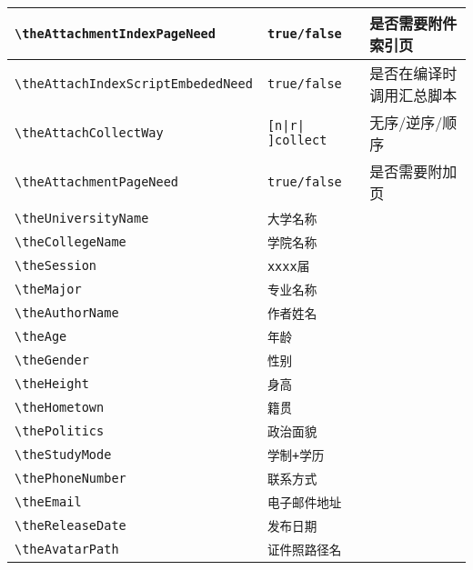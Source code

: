 \documentclass[a4paper,12pt]{ctexart}
\begin{document}
\begin{table}[!h]
\begin{tabularx}{\textwidth}{|l|l|>{\raggedright\arraybackslash}X|}
			\hline
			\texttt{\textbackslash theAttachmentIndexPageNeed} & \texttt{true/false}                            & 是否需要附件索引页               \\
			\hline
			\texttt{\textbackslash theAttachIndexScriptEmbededNeed} & \texttt{true/false}                      & 是否在编译时调用汇总脚本         \\
			\hline
			\texttt{\textbackslash theAttachCollectWay}    & \texttt{[n|r| ]collect}               & 无序/逆序/顺序                 \\
			\hline
			\texttt{\textbackslash theAttachmentPageNeed}  & \texttt{true/false}                               & 是否需要附加页                   \\
			\hline
			\texttt{\textbackslash theUniversityName}      & \texttt{大学名称}&\\
			\hline
			\texttt{\textbackslash theCollegeName}         & \texttt{学院名称}&\\
			\hline
			\texttt{\textbackslash theSession}             & \texttt{xxxx届}&\\
			\hline
			\texttt{\textbackslash theMajor}               & \texttt{专业名称}&\\
			\hline
			\texttt{\textbackslash theAuthorName}          & \texttt{作者姓名}&\\
			\hline
			\texttt{\textbackslash theAge}                 & \texttt{年龄}&\\
			\hline
			\texttt{\textbackslash theGender}              & \texttt{性别}&\\
			\hline
			\texttt{\textbackslash theHeight}              & \texttt{身高}&\\
			\hline
			\texttt{\textbackslash theHometown}            & \texttt{籍贯}&\\
			\hline
			\texttt{\textbackslash thePolitics}            & \texttt{政治面貌}&\\
			\hline
			\texttt{\textbackslash theStudyMode}           & \texttt{学制+学历}&\\
			\hline
			\texttt{\textbackslash thePhoneNumber}         & \texttt{联系方式}&\\
			\hline
			\texttt{\textbackslash theEmail}               & \texttt{电子邮件地址}&\\
			\hline
			\texttt{\textbackslash theReleaseDate}         & \texttt{发布日期}& \\
			\hline
			\texttt{\textbackslash theAvatarPath}          & \texttt{证件照路径名}&                \\
			\hline
		\end{tabularx}
	\end{table}
	
\end{document}
